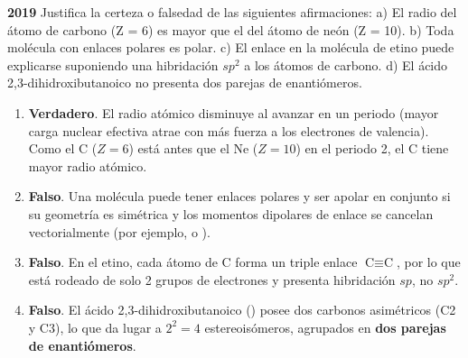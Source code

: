 \begin{exerciseEVAU}
    \textbf{2019} Justifica la certeza o falsedad de las siguientes afirmaciones: a) El radio del átomo de carbono (Z = 6) es mayor que el del átomo de neón (Z = 10). b) Toda molécula con enlaces polares es polar. c) El enlace en la molécula de etino puede explicarse suponiendo una hibridación $sp^2$ a los átomos de carbono. d) El ácido 2,3-dihidroxibutanoico no presenta dos parejas de enantiómeros.

    \begin{solu}


        \begin{enumerate}[label=\letraminuscula]
            \item \textbf{Verdadero}. El radio atómico disminuye al avanzar en un periodo (mayor carga nuclear efectiva atrae con más fuerza a los electrones de valencia). Como el C (\(Z=6\)) está antes que el Ne (\(Z=10\)) en el periodo 2, el C tiene mayor radio atómico.

            \item \textbf{Falso}. Una molécula puede tener enlaces polares y ser apolar en conjunto si su geometría es simétrica y los momentos dipolares de enlace se cancelan vectorialmente (por ejemplo,  o ).

            \item \textbf{Falso}. En el etino, cada átomo de C forma un triple enlace \(\text{C}\equiv\text{C}\), por lo que está rodeado de solo 2 grupos de electrones y presenta hibridación \(sp\), no \(sp^2\).

            \item \textbf{Falso}. El ácido 2,3-dihidroxibutanoico () posee dos carbonos asimétricos (C2 y C3), lo que da lugar a \(2^2=4\) estereoisómeros, agrupados en \textbf{dos parejas de enantiómeros}.
        \end{enumerate}
    \end{solu}
\end{exerciseEVAU}
